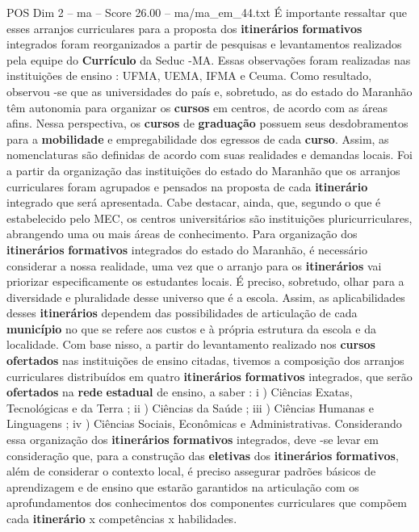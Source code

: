 \begin{textsample}{POS Dim 2 – ma – Score 26.00 – ma/ma\_em\_44.txt}
É importante ressaltar que esses arranjos curriculares para a proposta dos \textbf{itinerários} \textbf{formativos} integrados foram reorganizados a partir de pesquisas e levantamentos realizados pela equipe do \textbf{Currículo} da Seduc -MA.
Essas observações foram realizadas nas instituições de ensino : UFMA, UEMA, IFMA e Ceuma.
Como resultado, observou -se que as universidades do país e, sobretudo, as do estado do Maranhão têm autonomia para organizar os \textbf{cursos} em centros, de acordo com as áreas afins.
Nessa perspectiva, os \textbf{cursos} de \textbf{graduação} possuem seus desdobramentos para a \textbf{mobilidade} e empregabilidade dos egressos de cada \textbf{curso}.
Assim, as nomenclaturas são definidas de acordo com suas realidades e demandas locais.
Foi a partir da organização das instituições do estado do Maranhão que os arranjos curriculares foram agrupados e pensados na proposta de cada \textbf{itinerário} integrado que será apresentada.
Cabe destacar, ainda, que, segundo o que é estabelecido pelo MEC, os centros universitários são instituições pluricurriculares, abrangendo uma ou mais áreas de conhecimento.
Para organização dos \textbf{itinerários} \textbf{formativos} integrados do estado do Maranhão, é necessário considerar a nossa realidade, uma vez que o arranjo para os \textbf{itinerários} vai priorizar especificamente os estudantes locais.
É preciso, sobretudo, olhar para a diversidade e pluralidade desse universo que é a escola.
Assim, as aplicabilidades desses \textbf{itinerários} dependem das possibilidades de articulação de cada \textbf{município} no que se refere aos custos e à própria estrutura da escola e da localidade.
Com base nisso, a partir do levantamento realizado nos \textbf{cursos} \textbf{ofertados} nas instituições de ensino citadas, tivemos a composição dos arranjos curriculares distribuídos em quatro \textbf{itinerários} \textbf{formativos} integrados, que serão \textbf{ofertados} na \textbf{rede} \textbf{estadual} de ensino, a saber : i ) Ciências Exatas, Tecnológicas e da Terra ; ii ) Ciências da Saúde ; iii ) Ciências Humanas e Linguagens ; iv ) Ciências Sociais, Econômicas e Administrativas.
Considerando essa organização dos \textbf{itinerários} \textbf{formativos} integrados, deve -se levar em consideração que, para a construção das \textbf{eletivas} dos \textbf{itinerários} \textbf{formativos}, além de considerar o contexto local, é preciso assegurar padrões básicos de aprendizagem e de ensino que estarão garantidos na articulação com os aprofundamentos dos conhecimentos dos componentes curriculares que compõem cada \textbf{itinerário} x competências x habilidades.

\end{textsample}
